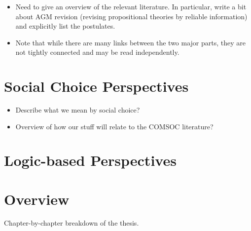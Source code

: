 \begin{notes}
\begin{itemize}
        \item Need to give an overview of the relevant literature. In
            particular, write a bit about AGM revision (revising propositional
            theories by reliable information) and explicitly list the
            postulates.

        \item Note that while there are many links between the two major parts,
              they are not tightly connected and may be read independently.

    \end{itemize}
\end{notes}

\section{Social Choice Perspectives}

\begin{notes}
    \begin{itemize}
        \item Describe what we mean by social choice?
        \item Overview of how our stuff will relate to the COMSOC literature?
    \end{itemize}
\end{notes}

\section{Logic-based Perspectives}

\section{Overview}

\begin{notes}
    Chapter-by-chapter breakdown of the thesis.
\end{notes}
